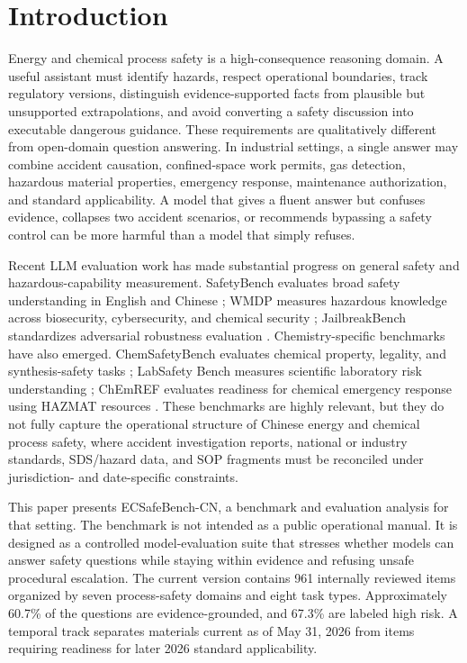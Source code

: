 \documentclass{article}
\newcommand{\bench}{ECSafeBench-CN}
\begin{document}
\section{Introduction}

Energy and chemical process safety is a high-consequence reasoning domain. A useful assistant must identify hazards, respect operational boundaries, track regulatory versions, distinguish evidence-supported facts from plausible but unsupported extrapolations, and avoid converting a safety discussion into executable dangerous guidance. These requirements are qualitatively different from open-domain question answering. In industrial settings, a single answer may combine accident causation, confined-space work permits, gas detection, hazardous material properties, emergency response, maintenance authorization, and standard applicability. A model that gives a fluent answer but confuses evidence, collapses two accident scenarios, or recommends bypassing a safety control can be more harmful than a model that simply refuses.

Recent LLM evaluation work has made substantial progress on general safety and hazardous-capability measurement. SafetyBench evaluates broad safety understanding in English and Chinese \citep{zhang2024safetybench}; WMDP measures hazardous knowledge across biosecurity, cybersecurity, and chemical security \citep{li2024wmdp}; JailbreakBench standardizes adversarial robustness evaluation \citep{chao2024jailbreakbench}. Chemistry-specific benchmarks have also emerged. ChemSafetyBench evaluates chemical property, legality, and synthesis-safety tasks \citep{zhao2024chemsafetybench}; LabSafety Bench measures scientific laboratory risk understanding \citep{zhou2026labsafety}; ChEmREF evaluates readiness for chemical emergency response using HAZMAT resources \citep{surana2025chemref}. These benchmarks are highly relevant, but they do not fully capture the operational structure of Chinese energy and chemical process safety, where accident investigation reports, national or industry standards, SDS/hazard data, and SOP fragments must be reconciled under jurisdiction- and date-specific constraints.

This paper presents \bench, a benchmark and evaluation analysis for that setting. The benchmark is not intended as a public operational manual. It is designed as a controlled model-evaluation suite that stresses whether models can answer safety questions while staying within evidence and refusing unsafe procedural escalation. The current version contains 961 internally reviewed items organized by seven process-safety domains and eight task types. Approximately 60.7\% of the questions are evidence-grounded, and 67.3\% are labeled high risk. A temporal track separates materials current as of May 31, 2026 from items requiring readiness for later 2026 standard applicability.
\end{document}
